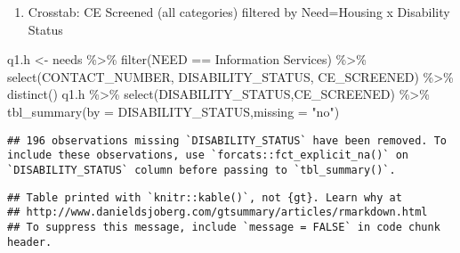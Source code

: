 \documentclass[
]{article}
\newenvironment{Shaded}{\begin{snugshade}}{\end{snugshade}}
\newcommand{\AttributeTok}[1]{\textcolor[rgb]{0.77,0.63,0.00}{#1}}
\newcommand{\FunctionTok}[1]{\textcolor[rgb]{0.00,0.00,0.00}{#1}}
\newcommand{\NormalTok}[1]{#1}
\newcommand{\OtherTok}[1]{\textcolor[rgb]{0.56,0.35,0.01}{#1}}
\newcommand{\SpecialCharTok}[1]{\textcolor[rgb]{0.00,0.00,0.00}{#1}}
\newcommand{\StringTok}[1]{\textcolor[rgb]{0.31,0.60,0.02}{#1}}
\providecommand{\tightlist}{%
  \setlength{\itemsep}{0pt}\setlength{\parskip}{0pt}}
\begin{document}
\begin{enumerate}
\def\labelenumi{\alph{enumi}.}
\setcounter{enumi}{7}
\tightlist
\item
  Crosstab: CE Screened (all categories) filtered by Need=Housing x
  Disability Status
\end{enumerate}

\begin{Shaded}
\begin{Highlighting}[]
\NormalTok{q1.h }\OtherTok{\textless{}{-}}\NormalTok{ needs }\SpecialCharTok{\%\textgreater{}\%} \FunctionTok{filter}\NormalTok{(NEED }\SpecialCharTok{==} \StringTok{\textquotesingle{}Information Services\textquotesingle{}}\NormalTok{) }\SpecialCharTok{\%\textgreater{}\%} \FunctionTok{select}\NormalTok{(CONTACT\_NUMBER, DISABILITY\_STATUS, CE\_SCREENED) }\SpecialCharTok{\%\textgreater{}\%} \FunctionTok{distinct}\NormalTok{()}
\NormalTok{q1.h }\SpecialCharTok{\%\textgreater{}\%} \FunctionTok{select}\NormalTok{(DISABILITY\_STATUS,CE\_SCREENED) }\SpecialCharTok{\%\textgreater{}\%} \FunctionTok{tbl\_summary}\NormalTok{(}\AttributeTok{by =}\NormalTok{ DISABILITY\_STATUS,}\AttributeTok{missing =} \StringTok{"no"}\NormalTok{)}
\end{Highlighting}
\end{Shaded}

\begin{verbatim}
## 196 observations missing `DISABILITY_STATUS` have been removed. To include these observations, use `forcats::fct_explicit_na()` on `DISABILITY_STATUS` column before passing to `tbl_summary()`.
\end{verbatim}

\begin{verbatim}
## Table printed with `knitr::kable()`, not {gt}. Learn why at
## http://www.danieldsjoberg.com/gtsummary/articles/rmarkdown.html
## To suppress this message, include `message = FALSE` in code chunk header.
\end{verbatim}
\end{document}
